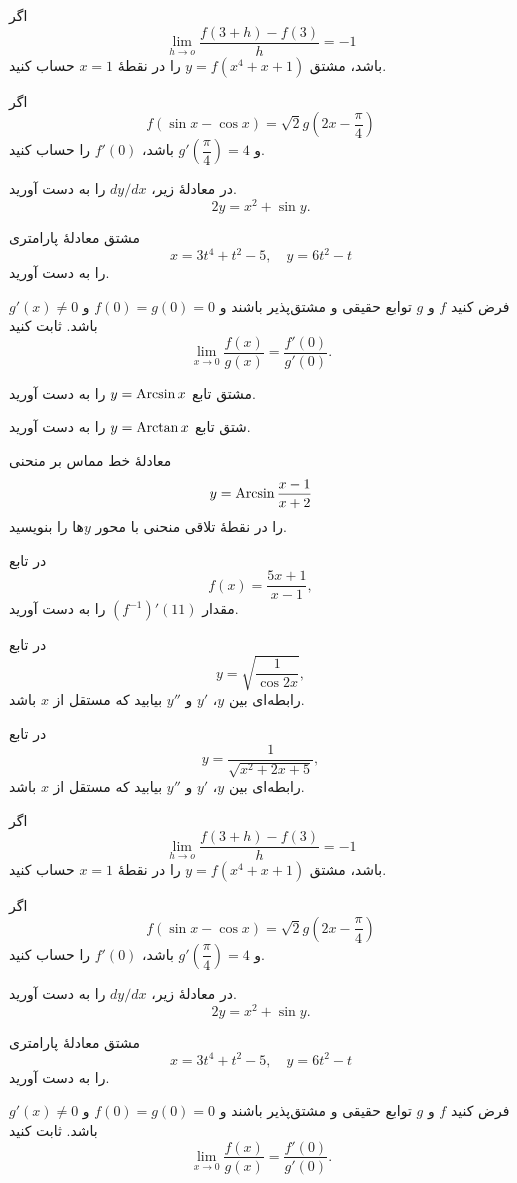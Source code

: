 \begin{pproblems}[تمرین‌ها]
اگر 
\[
\lim_{h\rightarrow o} \dfrac{f(3+h)-f(3)}{h}=-1
\]
باشد، مشتق $y=f(x^4+x+1)$ را در نقطهٔ $x=1$ حساب کنید.
\item \label{p1-14}
اگر 
\[
f(\sin x-\cos x)=\sqrt{2} g (2x-\dfrac{\pi}{4})
\]
و $g'(\dfrac{\pi}{4})=4$ باشد، $f'(0)$ را حساب کنید.
\item \label{p1-15}
در معادلهٔ زیر، $dy/dx$ را به دست آورید.
\[
2y=x^2+\sin y.
\]
\item \label{p1-16}
مشتق معادلهٔ پارامتری 
\[
x=3t^4+t^2-5,\quad y=6t^2-t
\]
را به دست آورید.
\item \label{p1-17}
فرض کنید $f$ و $g$ توابع حقیقی و مشتق‌پذیر باشند و $f(0)=g(0)=0$ و $g'(x)\neq 0$ باشد. ثابت
کنید 
\[
\lim_{x\rightarrow 0}\dfrac{f(x)}{g(x)}=\dfrac{f'(0)}{g'(0)}.
\]
\item \label{p1-18}
مشتق تابع $y=\operatorname{Arcsin} x$ را به دست آورید.
\item \label{p1-19}
شتق تابع $y=\operatorname{Arctan} x$ را به دست آورید.
\item \label{p1-20}
معادلهٔ خط مماس بر منحنی 
\[
y=\operatorname{Arcsin} \dfrac{x-1}{x+2}
\]
را در نقطهٔ تلاقی منحنی با محور $y$ها را بنویسید.
\item \label{p1-21}
در تابع
\[
f(x)=\dfrac{5 x+1}{x-1},
\]
مقدار 
$(f^{-1})'(11)$
را به دست آورید.
\item \label{p1-22}
در تابع
\[
y=\sqrt{\dfrac{1}{\cos 2x}},
\]
رابطه‌ای بین $y$، $y'$ و $y''$ بیابید که مستقل از $x$ باشد.
\item \label{p1-23}
در تابع
\[
y=\dfrac{1}{\sqrt{	x^2+2x+5}},
\]
رابطه‌ای بین $y$، $y'$ و $y''$ بیابید که مستقل از $x$ باشد.

\end{pproblems}

\begin{pproblems}[تمرین‌ها]
\item \label{p2-1}

اگر 
\[
\lim_{h\rightarrow o} \dfrac{f(3+h)-f(3)}{h}=-1
\]
باشد، مشتق $y=f(x^4+x+1)$ را در نقطهٔ $x=1$ حساب کنید.
\item \label{p2-2}
اگر 
\[
f(\sin x-\cos x)=\sqrt{2} g (2x-\dfrac{\pi}{4})
\]
و $g'(\dfrac{\pi}{4})=4$ باشد، $f'(0)$ را حساب کنید.
\item \label{p2-3}
در معادلهٔ زیر، $dy/dx$ را به دست آورید.
\[
2y=x^2+\sin y.
\]
\item \label{p2-4}
مشتق معادلهٔ پارامتری 
\[
x=3t^4+t^2-5,\quad y=6t^2-t
\]
را به دست آورید.
\item \label{p2-5}
فرض کنید $f$ و $g$ توابع حقیقی و مشتق‌پذیر باشند و $f(0)=g(0)=0$ و $g'(x)\neq 0$ باشد. ثابت
کنید 
\[
\lim_{x\rightarrow 0}\dfrac{f(x)}{g(x)}=\dfrac{f'(0)}{g'(0)}.
\]
\end{pproblems}